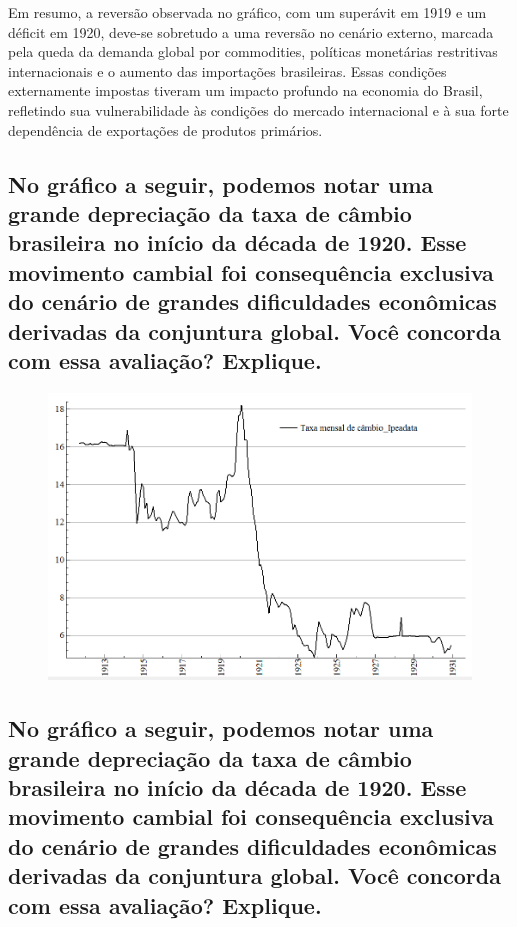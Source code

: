 \documentclass[a4paper,12pt]{article}[abntex2]
\begin{document}
Em resumo, a reversão observada no gráfico, com um superávit em 1919 e um déficit em 1920, deve-se sobretudo a uma reversão no cenário externo, marcada pela queda da demanda global por commodities, políticas monetárias restritivas internacionais e o aumento das importações brasileiras. Essas condições externamente impostas tiveram um impacto profundo na economia do Brasil, refletindo sua vulnerabilidade às condições do mercado internacional e à sua forte dependência de exportações de produtos primários.

\subsection{\textbf{No gráfico a seguir, podemos notar uma grande depreciação da taxa de câmbio brasileira no início da década de 1920. Esse movimento cambial foi consequência exclusiva do cenário de grandes dificuldades econômicas derivadas da conjuntura global. Você concorda com essa avaliação? Explique.}}

\begin{figure}[H]
    \centering
    \includegraphics[width=1.0\textwidth]{i2d3.png}
    \end{figure}

\subsection{\textbf{No gráfico a seguir, podemos notar uma grande depreciação da taxa de câmbio brasileira no início da década de 1920. Esse movimento cambial foi consequência exclusiva do cenário de grandes dificuldades econômicas derivadas da conjuntura global. Você concorda com essa avaliação? Explique.}}
\end{document}
